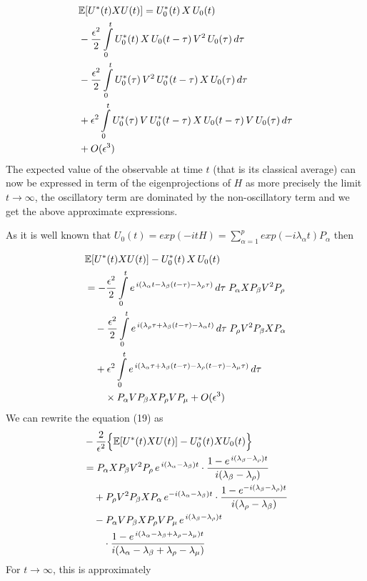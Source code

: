 \documentclass[journal,twocolumn]{IEEEtran}
\begin{document}
\begin{align}\nonumber
&\Bbb{E}[U^*(t) X U(t)] = U_0^{*}(t)\,X\,U_0(t) \\ \nonumber
&- \frac{\epsilon^2}{2}\int\limits_0^t U_0^{*}(t)\,X\,U_0(t-\tau)\,V^2\,U_0(\tau)\,d\tau \\ \nonumber
&- \frac{\epsilon^2}{2}\int\limits_0^t U_0^{*}(\tau)\,V^2\,U_0^{*}(t-\tau)\,X\,U_0(\tau)\,d\tau \\ \nonumber
&+ \epsilon^2\int\limits_0^t U_0^{*}(\tau)\,V\,U_0^{*}(t-\tau)\,X\,U_0(t-\tau)\,V\,U_0(\tau)\,d\tau \\
&+ O(\epsilon^3)
\end{align}
The expected value of the observable at time $t$ (that is its classical average) can now be expressed in term of the eigenprojections of $H$ as more precisely the limit $t\rightarrow
\infty$, the oscillatory term are dominated by the non-oscillatory term and we get the above approximate expressions.

As it is well known that $U_0(t)=exp(-i t H)=
\sum\limits_{\alpha=1}^p exp(-i \lambda_{\alpha}t)P_\alpha$ then

\begin{align}\nonumber
&\Bbb{E}[U^{*}(t)X U(t)] - U_0^*(t)\,X\,U_0(t) \\ \nonumber
&= -\frac{\epsilon^2}{2} \int\limits_0^t
   e^{\,i(\lambda_\alpha t - \lambda_\beta(t-\tau) - \lambda_\rho\tau)}\,d\tau\;
   P_\alpha X P_\beta V^2 P_\rho \\ \nonumber
&\quad -\frac{\epsilon^2}{2} \int\limits_0^t
   e^{\,i(\lambda_\rho\tau + \lambda_\beta(t-\tau) - \lambda_\alpha t)}\,d\tau\;
   P_\rho V^2 P_\beta X P_\alpha \\ \nonumber
&\quad + \epsilon^2 \int\limits_0^t
   e^{\,i(\lambda_\alpha\tau + \lambda_\beta(t-\tau)
      - \lambda_\rho(t-\tau) - \lambda_\mu\tau)}\,d\tau \\
&\qquad \times P_\alpha V P_\beta X P_\rho V P_\mu
   + O(\epsilon^3)
\end{align}
We can rewrite the equation (19) as
\begin{align}\nonumber
&-\frac{2}{\epsilon^2}\Bigl\{\Bbb{E}[U^*(t)X U(t)] - U_0^*(t)X U_0(t)\Bigr\}
\\ \nonumber
&= P_\alpha X P_\beta V^2 P_\rho\,
   e^{\,i(\lambda_\alpha-\lambda_\beta)t}
   \cdot\frac{1 - e^{\,i(\lambda_\beta-\lambda_\rho)t}}
             {i(\lambda_\beta-\lambda_\rho)}
\\ \nonumber
&\quad + P_\rho V^2 P_\beta X P_\alpha\,
   e^{-i(\lambda_\alpha-\lambda_\beta)t}
   \cdot\frac{1 - e^{-i(\lambda_\beta-\lambda_\rho)t}}
             {i(\lambda_\rho-\lambda_\beta)}
\\ \nonumber
&\quad - P_\alpha V P_\beta X P_\rho V P_\mu\,
   e^{\,i(\lambda_\beta-\lambda_\rho)t}
\\
&\quad\quad \cdot\frac{1 - e^{\,i(\lambda_\alpha
      -\lambda_\beta+\lambda_\rho-\lambda_\mu)t}}
             {i(\lambda_\alpha-\lambda_\beta+\lambda_\rho-\lambda_\mu)}
\end{align}
For $t\rightarrow \infty$, this is approximately
\end{document}
